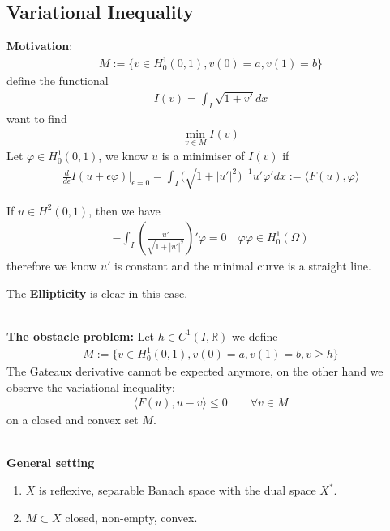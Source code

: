 \subsection{Variational Inequality}
\textbf{Motivation}:
\begin{align*}
	M:= \{v \in H^1_0(0, 1), v(0) = a, v(1) = b \}
\end{align*}
define the functional 
\begin{align*}
	I(v) = \int_I \sqrt{1 + v'} dx 
\end{align*}
want to find
\begin{align*}
	\min_{ v \in M} I(v) 
\end{align*}
Let $\varphi \in H^1_0(0, 1)$, we know $u$ is a minimiser of $I(v)$ if 
\begin{align*}
	\frac{d}{d\epsilon} I(u + \epsilon \varphi)|_{ \epsilon = 0}   = \int_I \bigg(\sqrt{1 + |u'|^2} \bigg)^{-1} u' \varphi' dx := \langle F(u), \varphi \rangle  
\end{align*}

\begin{remark}
If $u \in H^2(0, 1)$, then we have
\begin{align*}
	-\int_I (\frac{u'}{\sqrt{1 + |u'|^2}})' \varphi = 0 \quad \varphi \varphi \in H_0^1(\Omega)
\end{align*}
therefore we know $u'$ is constant and the minimal curve is a straight line. 	
\end{remark}
The \textbf{Ellipticity} is clear in this case.  

\quad\\
\textbf{The obstacle problem:} Let $h \in C^1(I, \mathbb{R})$ we define
\begin{align*}
	M:= \{v \in H^1_0(0, 1), v(0) = a, v(1) = b, v \ge h \}
\end{align*}
The Gateaux derivative cannot be expected anymore, on the other hand we observe the variational inequality:
\begin{align*}
	\langle F(u), u - v \rangle  \le 0 \qquad \forall v \in M 
\end{align*}
on a closed and convex set $M$. 



\quad\\
\textbf{General setting}
\begin{enumerate}
	\item $X$ is reflexive, separable Banach space with the dual space $X^*$. 
	\item $M \subset X$ closed, non-empty, convex. 
\end{enumerate}

